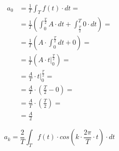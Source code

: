\begin{task}
\begin{equation}
\begin{aligned}
a_0 &=\frac{1}{T}\int_{T}f(t) \cdot dt =\\
&=\frac{1}{T} \left( \int_{0}^{\frac{T}{2}} A \cdot dt + \int_{\frac{T}{2}}^{T} 0 \cdot dt \right ) = \\
&=\frac{1}{T} \left( A \cdot \int_{0}^{\frac{T}{2}} dt + 0 \right ) = \\
&=\frac{1}{T} \left( A \cdot \left. t\right |_{0}^{\frac{T}{2}} \right ) = \\
&=\frac{A}{T} \cdot \left. t\right |_{0}^{\frac{T}{2}} = \\
&=\frac{A}{T} \cdot \left( \frac{T}{2} - 0 \right ) = \\
&=\frac{A}{T} \cdot \left( \frac{T}{2} \right ) = \\
&=\frac{A}{2} 
\end{aligned}
\end{equation}




\begin{equation}
a_k=\frac{2}{T}\int_{T}f(t) \cdot cos\left( k \cdot \frac{2\pi}{T} \cdot t\right) \cdot dt
\end{equation}



\end{task}
